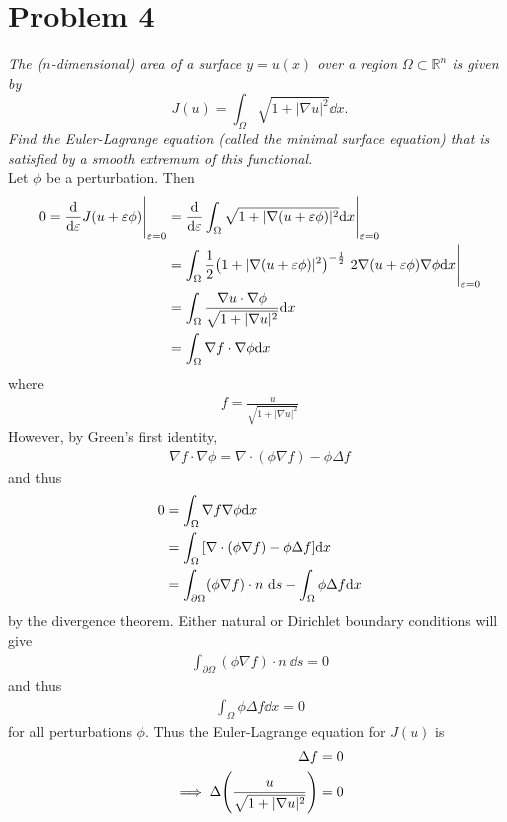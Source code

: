 \documentclass[12pt]{article}
\theoremstyle{plain}
\newcommand{\E}{\varepsilon}
\begin{document}
\section*{Problem 4}
\emph{The ($n$-dimensional) area of a surface $y = u(x)$ over a region $\Omega \subset \mathbb{R}^n$ is given by $$J(u) = \int_\Omega \sqrt{1 + |\nabla u|^2}\dd x.$$  Find the Euler-Lagrange equation (called the minimal surface equation) that is satisfied by a smooth extremum of this functional.} \\

Let $\phi$ be a perturbation.  Then
\begin{align*}
    0 = \frac{\dd}{\dd \E} J(u + \E\phi) \Bigg|_{\E= 0} &= \frac{\dd}{\dd \E} \int_\Omega \sqrt{1 + |\nabla(u + \E\phi)|^2}\dd x \Bigg|_{\E= 0} \\
    &= \int_\Omega \frac{1}{2}\qty(1 + |\nabla(u + \E\phi)|^2)^{-\frac{1}{2}}\ 2\nabla(u + \E\phi)\nabla \phi \dd x \Bigg|_{\E= 0} \\
    &= \int_\Omega \frac{\nabla u \cdot \nabla \phi}{\sqrt{1 + |\nabla u|^2}} \dd x \\
    &= \int_\Omega \nabla f \cdot \nabla \phi \dd x
\end{align*}
where
\begin{align*}
    f = \frac{u}{\sqrt{1 + |\nabla u|^2}}
\end{align*}
However, by Green's first identity,
\begin{align*}
    \nabla f \cdot \nabla \phi = \nabla \cdot(\phi\nabla f) - \phi\Delta f
\end{align*}
and thus
\begin{align*}
    0 &= \int_\Omega \nabla f \nabla \phi \dd x \\
    &= \int_\Omega \qty[\nabla \cdot (\phi\nabla f) - \phi\Delta f]\dd x \\
    &= \int_{\partial\Omega}(\phi\nabla f)\cdot n\ \dd s - \int_\Omega \phi\Delta f\dd x
\end{align*}
by the divergence theorem.  Either natural or Dirichlet boundary conditions will give
\begin{align*}
    \int_{\partial\Omega}(\phi\nabla f)\cdot n\ \dd s = 0
\end{align*}
and thus
\begin{align*}
    \int_\Omega \phi \Delta f\dd x = 0
\end{align*}
for all perturbations $\phi$.  Thus the Euler-Lagrange equation for $J(u)$ is
\begin{align*}
    \Delta f &= 0 \\
    \implies \Delta \qty(\frac{u}{\sqrt{1 + |\nabla u|^2}}) &= 0
\end{align*}
\end{document}
